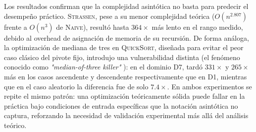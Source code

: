 Los resultados confirman que la complejidad asintótica no basta para
predecir el desempeño práctico. \textsc{Strassen}, pese a su menor
complejidad teórica ($O(n^{2.807})$ frente a $O(n^3)$ de \textsc{Naive}),
resultó hasta $364\times$ más lento en el rango medido, debido al
overhead de asignación de memoria de su recursión.
De forma análoga, la optimización de mediana de tres en \textsc{QuickSort},
diseñada para evitar el peor caso clásico del pivote fijo, introdujo una
vulnerabilidad distinta (el fenómeno conocido como \textit{"median-of-three
killer"} \cite{mcilroy1999}): en el dominio D7, tardó $331\times$ y
$265\times$ más en los casos ascendente y descendente respectivamente
que en D1, mientras que en el caso aleatorio la diferencia fue de solo
$7.4\times$. En ambos experimentos se repite el mismo patrón: una
optimización teóricamente sólida puede fallar en la práctica bajo
condiciones de entrada específicas que la notación asintótica no
captura, reforzando la necesidad de validación experimental más allá
del análisis teórico.